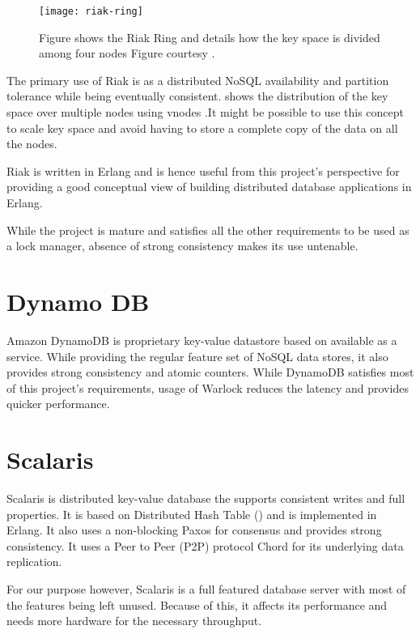 \begin{figure}
  \texttt{[image: riak-ring]}
  \caption[Riak Ring]{%
    Figure shows the Riak Ring and details how the key space is divided among
    four nodes
    Figure courtesy \citet{riak}.}
  \label{figure:riak.ring}
\end{figure}

The primary use of Riak is as a distributed NoSQL%
availability and partition tolerance while
being eventually consistent.  shows the distribution of the
key space over multiple nodes using vnodes%
.It might be possible to use this concept to scale key space and avoid having
to store a complete copy of the data on all the nodes.

Riak is written in Erlang and is hence useful from this project's perspective
for providing a good conceptual view of building distributed database
applications in Erlang.

While the project is mature and satisfies all
the other requirements to be used as a lock manager, absence of strong
consistency makes its use untenable.

\section{Dynamo DB}

Amazon DynamoDB \citep{dynamoDB} is proprietary key-value datastore based on
\citet{DeCandia07} available as a service. While providing the regular
feature set of NoSQL data stores, it also provides strong consistency and
atomic counters. While DynamoDB satisfies most of this project's requirements,
usage of Warlock reduces the latency and provides quicker performance.

\section{Scalaris}

Scalaris \citep{scalaris} is distributed key-value database the supports
consistent writes and full  properties. It is based on Distributed 
Hash Table ()%
and is implemented in Erlang. It also uses a non-blocking Paxos for consensus
and provides strong consistency. It uses a Peer to Peer (P2P) protocol \dash{}
Chord \citep{StoicaMKKB01} for its underlying data replication. 

For our purpose however, Scalaris is a full featured database server with most
of the features being left unused. Because of this, it affects its performance
and needs more hardware for the necessary throughput.

